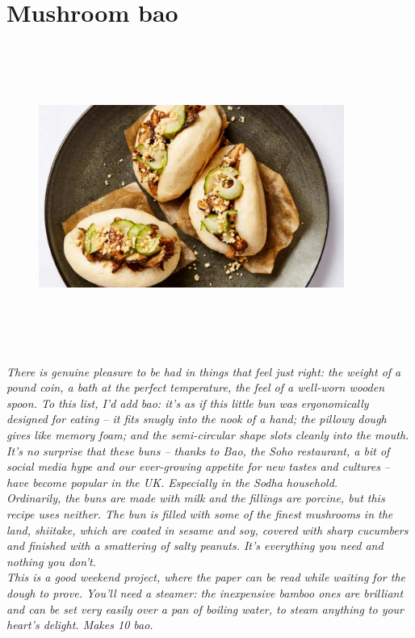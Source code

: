 \documentclass{book}
\begin{document}
\section{Mushroom bao}
\begin{figure}
\centering\includegraphics[width=10cm,height=10cm,keepaspectratio]{Recipe_Pictures/Mushroom_bao.png}
\end{figure}
\emph{There is genuine pleasure to be had in things that feel just right: the weight of a pound coin, a bath at the perfect temperature, the feel of a well-worn wooden spoon. To this list, I’d add bao: it’s as if this little bun was ergonomically designed for eating – it fits snugly into the nook of a hand; the pillowy dough gives like memory foam; and the semi-circular shape slots cleanly into the mouth.\\ 
It’s no surprise that these buns – thanks to Bao, the Soho restaurant, a bit of social media hype and our ever-growing appetite for new tastes and cultures – have become popular in the UK. Especially in the Sodha household.\\ 
Ordinarily, the buns are made with milk and the fillings are porcine, but this recipe uses neither. The bun is filled with some of the finest mushrooms in the land, shiitake, which are coated in sesame and soy, covered with sharp cucumbers and finished with a smattering of salty peanuts. It’s everything you need and nothing you don’t.\\ 
This is a good weekend project, where the paper can be read while waiting for the dough to prove. You’ll need a steamer: the inexpensive bamboo ones are brilliant and can be set very easily over a pan of boiling water, to steam anything to your heart’s delight. Makes 10 bao.}\\\\ 
\end{document}

